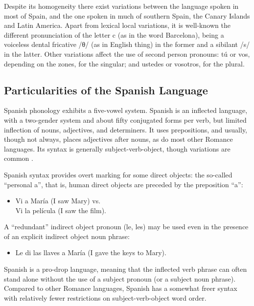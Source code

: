 \begin{multicols}{2}
Despite its homogeneity there exist variations between the language spoken in most of Spain, and the one spoken in much of southern Spain, the Canary Islands and Latin America. Apart from lexical local variations, it is well-known the different pronunciation of the letter c (as in the word Barcelona), being a voiceless dental fricative /θ/ (as in English thing) in the former and a sibilant /s/ in the latter. Other variations affect the use of second person pronouns: tú or vos, depending on the zones, for the singular; and ustedes or vosotros, for the plural.

\subsection{Particularities of the Spanish Language}

Spanish phonology exhibits a five-vowel system. Spanish is an inflected language, with a two-gender system and about fifty conjugated forms per verb, but limited inflection of nouns, adjectives, and determiners. It uses prepositions, and usually, though not always, places adjectives after nouns, as do most other Romance languages. Its syntax is generally subject-verb-object, though variations are common \cite{spanishgram}.


Spanish syntax provides overt marking for some direct objects: the so-called ``personal a'', that is, human direct objects are preceded by the preposition “a”:

\begin{itemize}    
\item[] Vi a María (I saw Mary) vs.\\ Vi la película (I saw the film).
\end{itemize}

A ``redundant'' indirect object pronoun (le, les) may be used even in the presence of an explicit indirect object noun phrase:

\begin{itemize}    
\item[] Le di las llaves a María (I gave the keys to Mary).
\end{itemize}

Spanish is a pro-drop language, meaning that the inflected verb phrase can often stand alone without the use of a subject pronoun (or a subject noun phrase). Compared to other Romance languages, Spanish has a somewhat freer syntax with relatively fewer restrictions on subject-verb-object word order.


\end{multicols}
